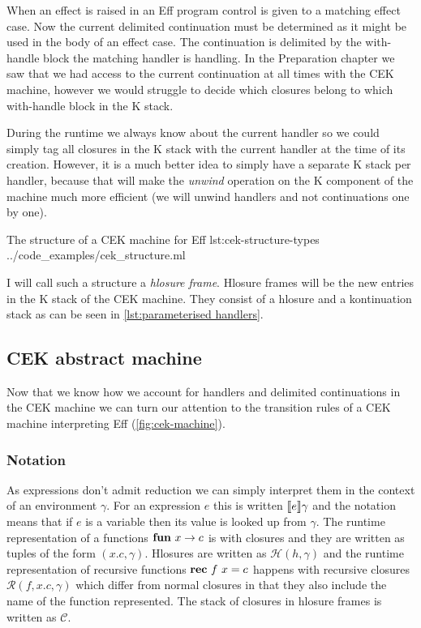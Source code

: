 \documentclass[class=article, crop=false]{standalone}
\begin{document}
When an effect is raised in an Eff program control is given to a matching effect case.
Now the current delimited continuation must be determined as it might be used in the body
of an effect case. The continuation is delimited by the with-handle block the matching
handler is handling. In the Preparation chapter we saw that we had access to the current
continuation at all times with the CEK machine, however we would struggle to decide which
closures belong to which with-handle block in the K stack.

During the runtime we always know about the current handler so we could simply tag all
closures in the K stack with the current handler at the time of its creation. However,
it is a much better idea to simply have a separate K stack per handler, because
that will make the \emph{unwind} operation on the K component of the machine much
more efficient (we will unwind handlers and not continuations one by one).

{The structure of a CEK machine for Eff}
{lst:cek-structure-types}
{../code_examples/cek_structure.ml}

I will call such a structure a \emph{hlosure frame}. Hlosure frames will be the new entries
in the K stack of the CEK machine. They consist of a hlosure and a kontinuation stack as
can be seen in \autoref{lst:parameterised handlers}.

\subsection{CEK abstract machine}

Now that we know how we account for handlers and delimited continuations in the CEK
machine we can turn our attention to the transition rules of a CEK machine interpreting Eff (\autoref{fig:cek-machine}).

\subsubsection{Notation}

As expressions don't admit reduction we can simply interpret them in the context of an environment $\gamma$. For an expression $e$
this is written $\llbracket e \rrbracket\gamma$ and the notation means that if $e$ is a variable then its value is looked up from $\gamma$. The runtime representation
of a functions $\mathbf{fun}\  x \to c$ is with closures and they are written as tuples of the form $(x.c, \gamma)$.
Hlosures are written as $\mathcal{H}(h, \gamma)$ and the runtime representation of recursive functions $\mathbf{rec}\  f\ x = c$ happens with recursive
closures $\mathcal{R}(f, x.c, \gamma)$ which differ from normal closures in that they also include the name of the function represented.
The stack of closures in hlosure frames is written as $\mathcal{C}$.
\end{document}

